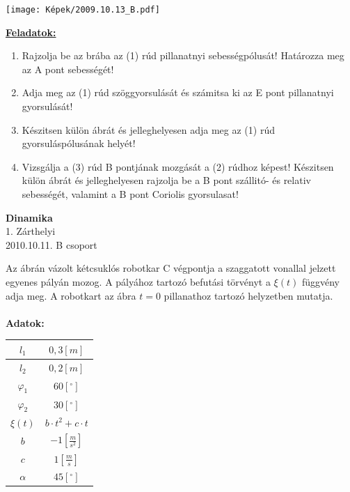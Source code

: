 \documentclass[11pt,a4paper]{article}
\begin{document}
\begin{center}
    \texttt{[image: Képek/2009.10.13\_B.pdf]}
\end{center}

\vspace{2em}
\underline{\textbf{Feladatok:}}
\begin{enumerate}
    \item Rajzolja be az brába az (1) rúd pillanatnyi sebességpólusát! Határozza meg az A pont
    sebességét!
    \item Adja meg az (1) rúd szöggyorsulását és számitsa ki az E pont pillanatnyi gyorsulását!
    \item Készitsen külön ábrát és jelleghelyesen adja meg az (1) rúd gyorsuláspólusának helyét!
    \item Vizsgálja a (3) rúd B pontjának mozgását a (2) rúdhoz képest! Készitsen külön ábrát és
    jelleghelyesen rajzolja be a B pont szállitó- és relativ sebességét, valamint a B pont Coriolis gyorsulasat!
\end{enumerate}
\newpage

\begin{center}
    \textbf{\LARGE{Dinamika}}\\
    1. Zárthelyi\\
    2010.10.11. B csoport
\end{center}
Az ábrán vázolt kétcsuklós robotkar C végpontja a szaggatott vonallal jelzett egyenes pályán mozog. A pályához tartozó befutási törvényt a \(\xi(t)\) függvény adja meg. A robotkart az ábra \(t = 0\) pillanathoz tartozó helyzetben mutatja.\\\\
\textbf{Adatok:}\\
\begin{tabular}{| c | c |}
    \hline
    $l_1 $&$ 0,3 [m]$\\
    \hline
    $l_2 $&$ 0,2 [m]$\\
    \hline
    $\varphi_1 $&$ 60 [^\circ]$\\ 
    \hline
    $\varphi_2 $&$ 30 [^\circ]$\\
    \hline
    $\xi(t) $&$ b \cdot t^2 + c \cdot t$\\
    \hline
    $b $&$ -1 \left[\frac{m}{s^2}\right]$\\
    \hline
    $c $&$ 1 \left[\frac{m}{s}\right]$\\
    \hline
    $\alpha $&$ 45 [^\circ]$\\
    \hline

\end{tabular}
\end{document}

